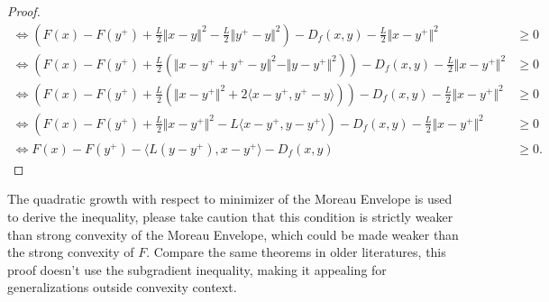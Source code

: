 \documentclass[12pt]{article}
\begin{document}
\begin{proof}
{\begin{align*}
            \iff 
            \left(
                F(x) - F(y^+) 
                + 
                \frac{L}{2}\Vert x - y\Vert^2 - 
                \frac{L}{2}\Vert y^+ - y\Vert^2
            \right)
            - 
            D_f(x, y) 
            - \frac{L}{2}\Vert x - y^+\Vert^2
            &\ge 0
            \\
            \iff 
            \left(
                F(x) - F(y^+) 
                + 
                \frac{L}{2}
                \left(
                    \Vert x - y^+ + y^+ - y\Vert^2
                    - 
                    \Vert y - y^+\Vert^2
                \right)
            \right)
            - 
            D_f(x, y) 
            - \frac{L}{2}\Vert x - y^+\Vert^2
            &\ge 0
            \\
            \iff 
            \left(
                F(x) - F(y^+) 
                + 
                \frac{L}{2}
                \left(
                    \Vert x - y^+\Vert^2 + 
                    2\langle x - y^+, y^+ - y\rangle
                \right)
            \right)
            - 
            D_f(x, y) 
            - \frac{L}{2}\Vert x - y^+\Vert^2
            &\ge 0
            \\
            \iff
            \left(
                F(x) - F(y^+) + \frac{L}{2}\Vert x - y^+\Vert^2 
                - L\langle  x - y^+, y - y^+\rangle
            \right)
            - 
            D_f(x, y) 
            - \frac{L}{2}\Vert x - y^+\Vert^2
            &\ge 0
            \\
            \iff 
            F(x) - F(y^+)
            - \langle L(y - y^+), x - y^+\rangle
            - D_f(x, y) 
            &\ge 0. 
        \end{align*}
        }
    \end{proof}
    \begin{remark}
        The quadratic growth with respect to minimizer of the Moreau Envelope is used to derive the inequality, please take caution that this condition is strictly weaker than strong convexity of the Moreau Envelope, which could be made weaker than the strong convexity of $F$. 
        Compare the same theorems in older literatures, this proof doesn't use the subgradient inequality, making it appealing for generalizations outside convexity context. 
    \end{remark}
    
\end{document}

